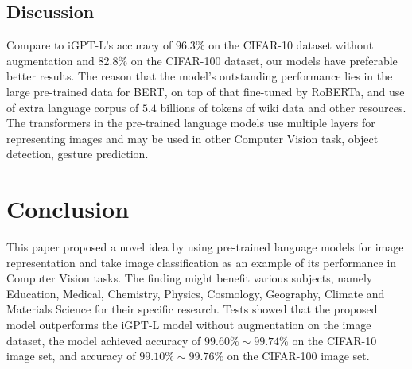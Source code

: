 \documentclass[review]{cvpr}
\begin{document}
\subsection{Discussion}

 Compare to iGPT-L's accuracy of 96.3\% on the CIFAR-10 dataset without augmentation and 82.8\% on the CIFAR-100 dataset, our models have preferable better results.
The reason that the model's outstanding performance lies in the large pre-trained data for BERT, on top of that fine-tuned by RoBERTa, and use of extra language corpus of
$5.4$ billions of tokens of wiki data and other resources.
The transformers in the pre-trained language models use multiple layers for representing images and may be used in other Computer Vision task, \eg object detection, gesture prediction.


\section{Conclusion}

 This paper proposed a novel idea by using pre-trained language models for image representation and take image classification as an example of its performance in Computer Vision tasks.
 The finding might benefit various subjects, namely Education, Medical, Chemistry, Physics, Cosmology, Geography, Climate and Materials Science for their specific research.
Tests showed that the proposed model outperforms the iGPT-L model without augmentation on the image dataset,
the model achieved accuracy of $99.60\%\sim99.74\%$ on the CIFAR-10 image set,
and accuracy of $99.10\%\sim99.76\%$ on the CIFAR-100 image set.
\end{document}
